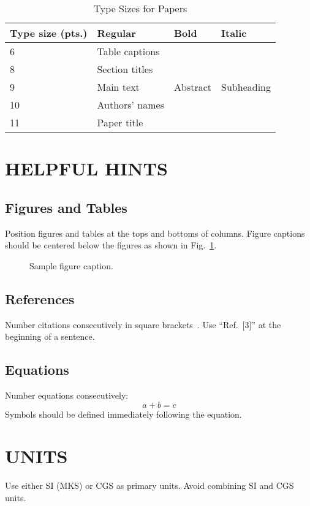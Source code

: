 \documentclass[conference]{IEEEtran}
\begin{document}
\begin{table}[ht]
\centering
\caption{Type Sizes for Papers}
\label{tab:type}
\begin{tabular}{|l|l|l|l|}
\hline
\textbf{Type size (pts.)} & \textbf{Regular} & \textbf{Bold} & \textbf{Italic} \\ \hline
6 & Table captions & & \\ \hline
8 & Section titles & & \\ \hline
9 & Main text & Abstract & Subheading \\ \hline
10 & Authors' names & & \\ \hline
11 & Paper title & & \\ \hline
\end{tabular}
\end{table}

\section{HELPFUL HINTS}
\subsection{Figures and Tables}
Position figures and tables at the tops and bottoms of columns. Figure captions should be centered below the figures as shown in Fig.~\ref{fig:sample}.

\begin{figure}[ht]
\centering
\caption{Sample figure caption.}
\label{fig:sample}
\end{figure}

\subsection{References}
Number citations consecutively in square brackets~\cite{ref1}. Use ``Ref.~[3]'' at the beginning of a sentence. 

\subsection{Equations}
Number equations consecutively:
\begin{equation}
a + b = c
\end{equation}
Symbols should be defined immediately following the equation.

\section{UNITS}
Use either SI (MKS) or CGS as primary units. Avoid combining SI and CGS units.
\end{document}
